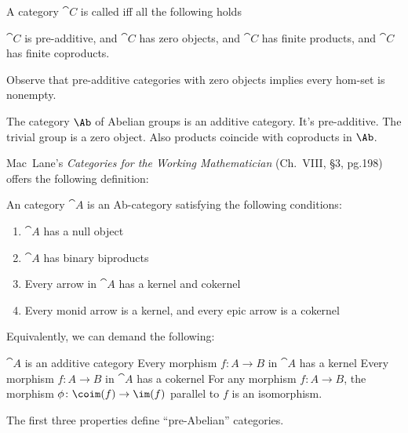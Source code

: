 \begin{definition}
A category $\cat{C}$ is called  iff all the following holds
\begin{itemize}
 $\cat{C}$ is pre-additive, and
 $\cat{C}$ has zero objects, and
 $\cat{C}$ has finite products, and
 $\cat{C}$ has finite coproducts.
\end{itemize}
Observe that pre-additive categories with zero objects implies every
hom-set is nonempty.
\end{definition}

\begin{example}
The category $\Ab$ of Abelian groups is an additive category. It's
pre-additive. The trivial group is a zero object. Also products
coincide with coproducts in $\Ab$.
\end{example}

\begin{definition}
Mac~Lane's \emph{Categories for the Working Mathematician} (Ch.~VIII,
\S3, pg.198) offers the following definition:

An  category $\cat{A}$ is an Ab-category satisfying
the following conditions:
\begin{enumerate}
\item $\cat{A}$ has a null object
\item $\cat{A}$ has binary biproducts
\item Every arrow in $\cat{A}$ has a kernel and cokernel
\item Every monid arrow is a kernel, and every epic arrow is a cokernel
\end{enumerate}
Equivalently, we can demand the following:
\begin{itemize}
 $\cat{A}$ is an additive category
 Every morphism $f\colon A\to B$ in $\cat{A}$ has a kernel
 Every morphism $f\colon A\to B$ in $\cat{A}$ has a cokernel
 For any morphism
$f\colon A\to B$, the morphism $\phi\colon\coim(f)\to\im(f)$ parallel
to $f$ is an isomorphism.
\end{itemize}
The first three properties define ``pre-Abelian'' categories.
\end{definition}

